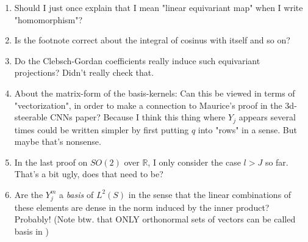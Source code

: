 \documentclass[12pt, a4paper]{article}
\theoremstyle{plain}
\theoremstyle{definition}
\theoremstyle{remark}
\newcommand{\R}{\mathds{R}}
\begin{document}
\begin{enumerate}
\item Should I just once explain that I mean "linear equivariant map" when I write "homomorphism"?
\item Is the footnote correct about the integral of cosinus with itself and so on?
\item Do the Clebsch-Gordan coefficients really induce such equivariant projections? Didn't really check that.
\item About the matrix-form of the basis-kernels: Can this be viewed in terms of "vectorization", in order to make a connection to Maurice's proof in the 3d-steerable CNNs paper? Because I think this thing where $Y_j$ appears several times could be written simpler by first putting $q$ into "rows" in a sense. But maybe that's nonsense.
\item In the last proof on $SO(2)$ over $\R$, I only consider the case $l > J$ so far. That's a bit ugly, does that need to be?
\item Are the $Y_j^m$ a \emph{basis} of $L^2(S)$ in the sense that the linear combinations of these elements are dense in the norm induced by the inner product? Probably! (Note btw. that ONLY orthonormal sets of vectors can be called basis in \cite{hilbert_spaces})
\end{enumerate}
\end{document}
